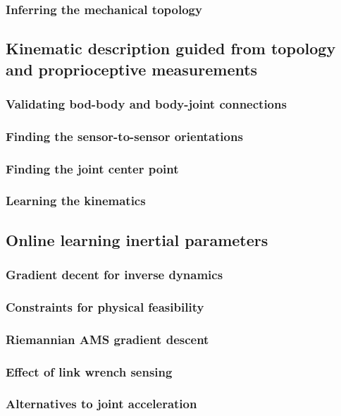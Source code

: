 \documentclass{article}
\begin{document}
\subsubsection{Inferring the mechanical topology}
\subsection{Kinematic description guided from topology and proprioceptive measurements}
\subsubsection{Validating bod-body and body-joint connections}
\subsubsection{Finding the sensor-to-sensor orientations}
\subsubsection{Finding the joint center point}
\subsubsection{Learning the kinematics}
\subsection{Online learning inertial parameters}
\subsubsection{Gradient decent for inverse dynamics}
\subsubsection{Constraints for physical feasibility}
\subsubsection{Riemannian AMS gradient descent}
\subsubsection{Effect of link wrench sensing}
\subsubsection{Alternatives to joint acceleration}
\end{document}
